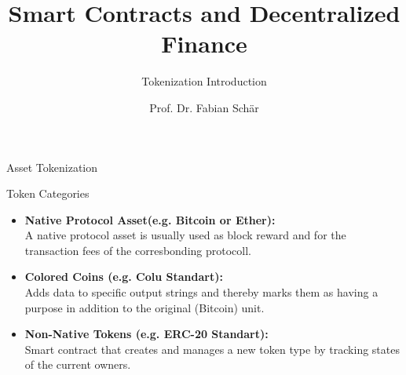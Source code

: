 \documentclass[handout]{beamer}
\title{Smart Contracts and Decentralized Finance}
\subtitle{Tokenization Introduction}
\author{Prof. Dr. Fabian Schär}
\institute{University of Basel}
\begin{document}
\thispagestyle{empty}
\begin{frame}[noframenumbering]
	\titlepage
\end{frame}


\begin{frame}{Asset Tokenization}
	\begin{figure} [h]
 		\center
			
 	\end{figure}
\end{frame}

\begin{frame}{Token Categories}
	\begin{itemize}
		\item<1-> \textbf{Native Protocol Asset(e.g. Bitcoin or Ether):} \\
					A native protocol asset is usually used as block reward and for the transaction fees of the corresbonding protocoll.
\vspace{0.5em}		
		
		\item<2-> \textbf{Colored Coins (e.g. Colu Standart):} \\
					Adds data to specific output strings and thereby marks them as having a purpose in addition to the original (Bitcoin) unit.
\vspace{0.5em}			
		
		\item<3-> \textbf{Non-Native Tokens (e.g. ERC-20 Standart):} \\
					Smart contract that creates and manages a new token type by tracking states of the current owners.	 
	\end{itemize}
	
\end{frame}
\end{document}
